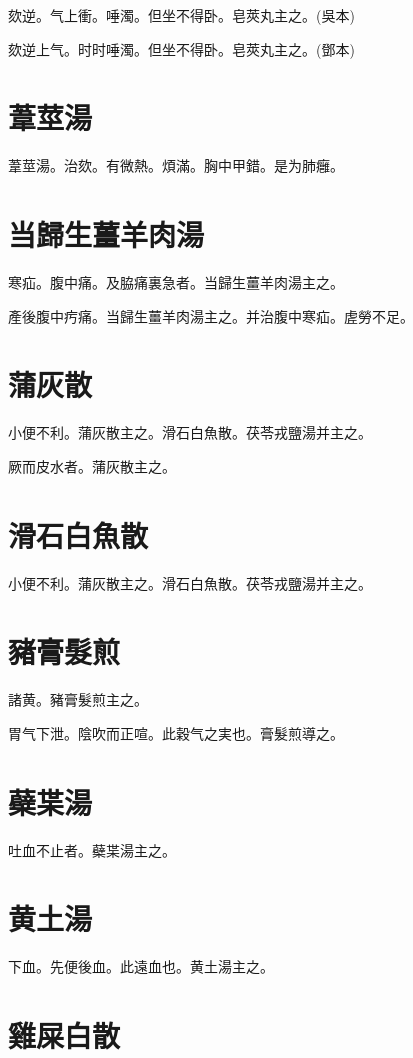 \documentclass[12pt,twoside,UTF8,b5paper]{ctexbook}
\begin{document}
欬逆。气上衝。唾濁。但坐不得卧。皂莢丸主之。(吳本)

欬逆上气。时时唾濁。但坐不得卧。皂莢丸主之。(鄧本)

\section{葦莖湯}

葦莖湯。治欬。有微熱。煩滿。胸中甲錯。是为肺癰。

\section{当歸生薑羊肉湯}

寒疝。腹中痛。及脇痛裏急者。当歸生薑羊肉湯主之。

產後腹中㽲痛。当歸生薑羊肉湯主之。并治腹中寒疝。虗勞不足。

\section{蒲灰散}

小便不利。蒲灰散主之。滑石白魚散。茯苓戎鹽湯并主之。

厥而皮水者。蒲灰散主之。

\section{滑石白魚散}

小便不利。蒲灰散主之。滑石白魚散。茯苓戎鹽湯并主之。

\section{豬膏髮煎}

諸黄。豬膏髮煎主之。

胃气下泄。陰吹而正喧。此穀气之実也。膏髮煎導之。

\section{蘗枼湯}

吐血不止者。蘗枼湯主之。

\section{黄土湯}

下血。先便後血。此遠血也。黄土湯主之。

\section{雞屎白散}
\end{document}
